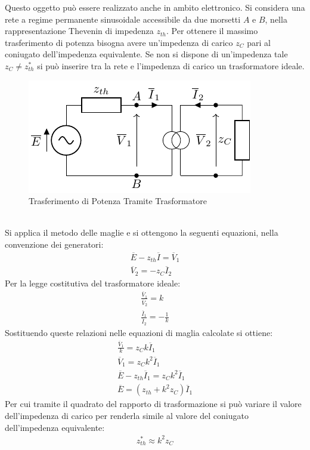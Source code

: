 \documentclass{article}
\numberwithin{equation}{subsection}
\begin{document}
Questo oggetto può essere realizzato anche in ambito elettronico. Si considera una rete a regime permanente sinusoidale accessibile da due morsetti $A$ e $B$, nella 
rappresentazione Thevenin di impedenza $z_{th}$. Per ottenere il massimo trasferimento di potenza bisogna avere un'impedenza di carico $z_C$ pari al coniugato dell'impedenza 
equivalente. Se non si dispone di un'impedenza tale $z_C\neq z_{th}^*$ si può inserire tra la rete e l'impedenza di carico un trasformatore ideale. 
\begin{figure}[ht]%
    \centering
    \includegraphics{potenza-trasformatore.pdf}%
    \caption{Trasferimento di Potenza Tramite Trasformatore}
    \label{fig:trasformatore-carico}
\end{figure}
\\
Si applica il metodo delle maglie e si ottengono la seguenti equazioni, nella convenzione dei generatori:
\begin{gather*}
    \overline{E}-z_{th}\overline{I}=\overline{V}_1\\
    \overline{V}_2=-z_C\overline{I}_2
\end{gather*}
Per la legge costitutiva del trasformatore ideale:
\begin{gather*}
    \displaystyle\frac{\overline{V}_1}{\overline{V}_2}=k\\
    \displaystyle\frac{\overline{I}_1}{\overline{I}_2}=-\frac{1}{k}
\end{gather*}
Sostituendo queste relazioni nelle equazioni di maglia calcolate si ottiene:
\begin{gather*}
    \displaystyle\frac{\overline{V}_1}{k}=z_Ck\overline{I}_1\\
    \overline{V}_1=z_Ck^2\overline{I}_1\\
    \overline{E}-z_{th}\overline{I}_1=z_Ck^2\overline{I}_1\\
    \overline{E}=(z_{th}+k^2z_C)\overline{I}_1
\end{gather*}
Per cui tramite il quadrato del rapporto di trasformazione si può variare il valore dell'impedenza di carico per renderla simile al valore del coniugato dell'impedenza 
equivalente:
\begin{gather*}
    z_{th}^*\approx k^2z_C
\end{gather*}
\end{document}
